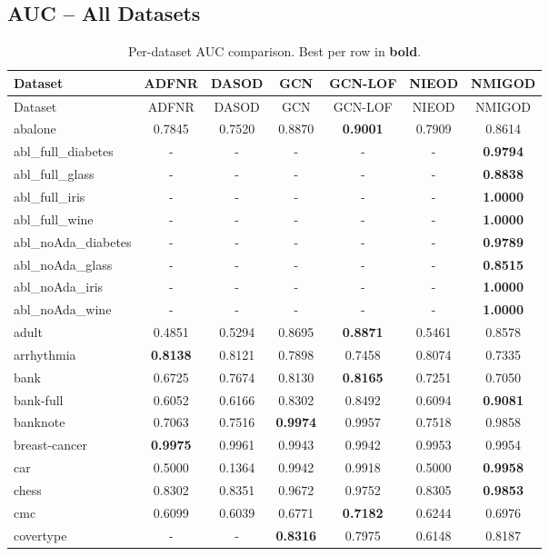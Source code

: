 \documentclass[11pt,a4paper]{article}
\begin{document}
\subsection{AUC -- All Datasets}
\begin{longtable}{lcccccc}
\caption{Per-dataset AUC comparison. Best per row in \textbf{bold}.}\\
\toprule Dataset & ADFNR & DASOD & GCN & GCN-LOF & NIEOD & NMIGOD \\ \midrule
\endfirsthead
\toprule Dataset & ADFNR & DASOD & GCN & GCN-LOF & NIEOD & NMIGOD \\ \midrule
\endhead
abalone & 0.7845 & 0.7520 & 0.8870 & \textbf{0.9001} & 0.7909 & 0.8614 \\
abl\_full\_diabetes & - & - & - & - & - & \textbf{0.9794} \\
abl\_full\_glass & - & - & - & - & - & \textbf{0.8838} \\
abl\_full\_iris & - & - & - & - & - & \textbf{1.0000} \\
abl\_full\_wine & - & - & - & - & - & \textbf{1.0000} \\
abl\_noAda\_diabetes & - & - & - & - & - & \textbf{0.9789} \\
abl\_noAda\_glass & - & - & - & - & - & \textbf{0.8515} \\
abl\_noAda\_iris & - & - & - & - & - & \textbf{1.0000} \\
abl\_noAda\_wine & - & - & - & - & - & \textbf{1.0000} \\
adult & 0.4851 & 0.5294 & 0.8695 & \textbf{0.8871} & 0.5461 & 0.8578 \\
arrhythmia & \textbf{0.8138} & 0.8121 & 0.7898 & 0.7458 & 0.8074 & 0.7335 \\
bank & 0.6725 & 0.7674 & 0.8130 & \textbf{0.8165} & 0.7251 & 0.7050 \\
bank-full & 0.6052 & 0.6166 & 0.8302 & 0.8492 & 0.6094 & \textbf{0.9081} \\
banknote & 0.7063 & 0.7516 & \textbf{0.9974} & 0.9957 & 0.7518 & 0.9858 \\
breast-cancer & \textbf{0.9975} & 0.9961 & 0.9943 & 0.9942 & 0.9953 & 0.9954 \\
car & 0.5000 & 0.1364 & 0.9942 & 0.9918 & 0.5000 & \textbf{0.9958} \\
chess & 0.8302 & 0.8351 & 0.9672 & 0.9752 & 0.8305 & \textbf{0.9853} \\
cmc & 0.6099 & 0.6039 & 0.6771 & \textbf{0.7182} & 0.6244 & 0.6976 \\
covertype & - & - & \textbf{0.8316} & 0.7975 & 0.6148 & 0.8187 \\

\end{longtable}
\end{document}
